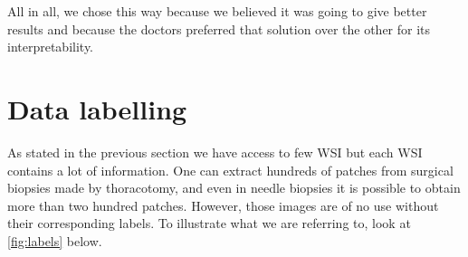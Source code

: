 All in all, we chose this way because we believed it was going to give better results and because the doctors preferred that solution over the other for its interpretability.


\section{Data labelling}\label{sec:data}

As stated in the previous section we have access to few WSI but each WSI contains a lot of information. One can extract hundreds of patches from surgical biopsies made by thoracotomy, and even in needle biopsies it is possible to obtain more than two hundred patches. However, those images are of no use without their corresponding labels. To illustrate what we are referring to, look at \autoref{fig:labels} below.

